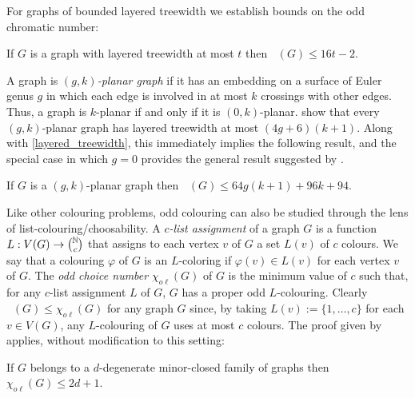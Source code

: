 \documentclass{patmorin}
\DeclareMathOperator{\odd}{\chi_o}
\newcommand{\oddc}{\chi_{o\ell}}
\begin{document}
For graphs of bounded layered treewidth we establish bounds on the odd chromatic number:

\begin{thm}\label{layered_treewidth_result}
  If $G$ is a graph with layered treewidth at most $t$ then $\odd(G)\le 16t-2$.
\end{thm}


A graph is \emph{$(g,k)$-planar graph} if it has an embedding on a surface of Euler genus $g$ in which each edge is involved in at most $k$ crossings with other edges.  Thus, a graph is $k$-planar if and only if it is $(0,k)$-planar.  \citet[Theorem 13]{dujmovic.eppstein.ea:genus} show that every $(g,k)$-planar graph has layered treewidth at most $(4g+6)(k+1)$.  Along with \cref{layered_treewidth}, this immediately implies the following result, and the special case in which $g=0$ provides the general result suggested by \citet{cranston.lafferty.ea:note}.


\begin{cor}\label{gk_planar}
  If $G$ is a $(g,k)$-planar graph then $\odd(G)\le 64g(k+1)+96k+94$.
\end{cor}

Like other colouring problems, odd colouring can also be studied through the lens of list-colouring/choosability.  A \emph{$c$-list assignment} of a graph $G$ is a function $L:V(G)\to\binom{\mathbb{N}}{c}$ that assigns to each vertex $v$ of $G$ a set $L(v)$ of $c$ colours.  We say that a colouring $\varphi$ of $G$ is an $L$-coloring if $\varphi(v)\in L(v)$ for each vertex $v$ of $G$.  The \emph{odd choice number} $\oddc(G)$ of $G$ is the minimum value of $c$ such that, for any $c$-list assignment $L$ of $G$, $G$ has a proper odd $L$-colouring. Clearly $\odd(G)\le \oddc(G)$ for any graph $G$ since, by taking $L(v):=\{1,\ldots,c\}$ for each $v\in V(G)$, any $L$-colouring of $G$  uses at most $c$ colours.  The proof given by \citet{cranston.lafferty.ea:note} applies, without modification to this setting:

\begin{thm}\label{degenerate}
  If $G$ belongs to a $d$-degenerate minor-closed family of graphs then $\oddc(G)\le 2d+1$.
\end{thm}
\end{document}
